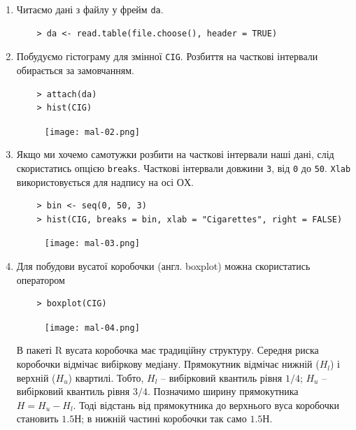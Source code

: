 \documentclass[a4paper, 12pt]{article}
\begin{document}
\begin{enumerate}
	\item Читаємо дані з файлу у фрейм \verb|da|.
	\begin{verbatim}
	> da <- read.table(file.choose(), header = TRUE)
	\end{verbatim}

	\item Побудуємо гістограму для змінної \verb|CIG|. Розбиття на часткові інтервали обирається за замовчанням.

	\begin{verbatim}
	> attach(da)
	> hist(CIG)
	\end{verbatim}

	\begin{figure}[H]
		\centering
		\texttt{[image: mal-02.png]}
	\end{figure}
	
	\item Якщо ми хочемо самотужки розбити на часткові інтервали наші дані, слід скористатись опцією \verb|breaks|. Часткові інтервали довжини \verb|3|, від \verb|0| до \verb|50|. \verb|Xlab| використовується для надпису на осі $ОХ$.

	\begin{verbatim}
	> bin <- seq(0, 50, 3)
	> hist(CIG, breaks = bin, xlab = "Cigarettes", right = FALSE)
	\end{verbatim}

	\begin{figure}[H]
		\centering
		\texttt{[image: mal-03.png]}
	\end{figure}

	\item Для побудови вусатої коробочки (англ. boxplot) можна скористатись оператором

	\begin{verbatim}
	> boxplot(CIG)
	\end{verbatim}

	\begin{figure}[H]
		\centering
		\texttt{[image: mal-04.png]}
	\end{figure}

	В пакеті R вусата коробочка має традиційну структуру. Середня риска коробочки відмічає вибіркову медіану. Прямокутник відмічає нижній ($H_l$) і верхній ($H_u$) квартилі. Тобто, $H_l$ -- вибірковий квантиль рівня $1/4$; $H_u$ -- вибірковий квантиль рівня $3/4$. Позначимо ширину прямокутника $H = H_u - H_l$. Тоді відстань від прямокутника до верхнього вуса коробочки становить $1.5Н$; в нижній частині коробочки так само $1.5Н$.


\end{enumerate}
\end{document}
